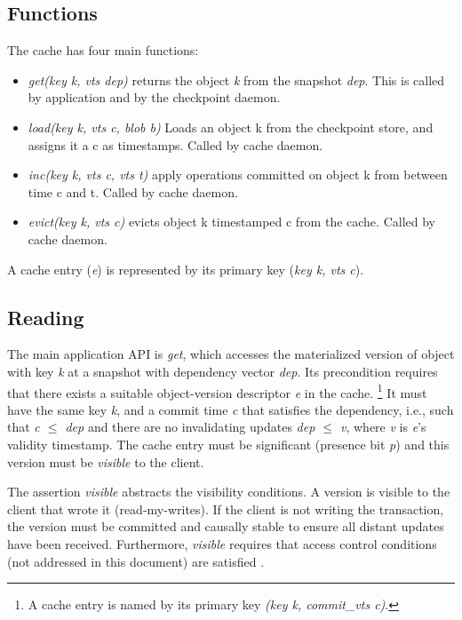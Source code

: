 \documentclass[twoside]{article}
\begin{document}

\subsection{Functions}
The cache has four main functions:
\begin{itemize}
  \item \emph{get(key k, vts dep)} returns the object \emph{k} from the snapshot 
  \emph{dep}. This is called by application and by the checkpoint daemon.
  \item \emph{load(key k, vts c, blob b)} Loads an object k from the checkpoint
  store, and assigns it a c as timestamps. Called by cache daemon.
  \item \emph{inc(key k, vts c, vts t)} apply operations committed on object k from
  between time c and t. Called by cache daemon.
  \item \emph{evict(key k, vts c)} evicts object k timestamped c from the cache. 
  Called by cache daemon.
\end{itemize}

A cache entry (\emph{e}) is represented by its primary key (\emph{key k, vts c}).

\subsection{Reading}
\label{sec:reading}

The main application API is \emph{get}, which accesses the materialized
version of object with key \emph{k} at a snapshot with dependency vector
\emph{dep}.
Its precondition requires that there exists a suitable object-version
descriptor \emph{e} in the cache.%
%
\footnote{
%
  A cache entry is named by its primary key \emph{(key k,
  commit\_vts c)}.
}
%
It must have the same key \emph{k}, and a commit time \emph{c} that
satisfies the dependency, i.e., such that \emph{c $\le$ dep} and there
are no invalidating updates \emph{dep $\le$ v}, where \emph{v} is
\emph{e}'s validity timestamp.
The cache entry must be significant (presence bit \emph{p}) and this
version must be \emph{visible} to the client.

The assertion \emph{visible} abstracts the visibility conditions.
A version is visible to the client that wrote it (read-my-writes).
If the client is not writing the transaction, the version must be
committed and causally stable to ensure all distant updates have been
received.
Furthermore, \emph{visible} requires that access control conditions (not
addressed in this document) are satisfied \cite{sec:rep:1786}.
\end{document}
